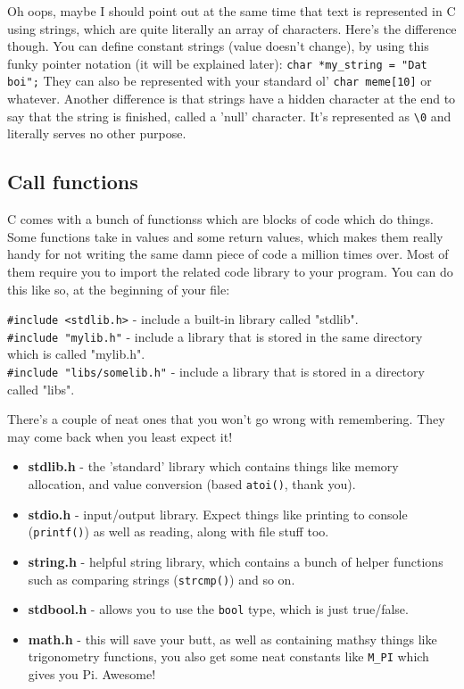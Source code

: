 Oh oops, maybe I should point out at the same time that text is represented in C using \glspl{string}, which are quite literally an array of characters. Here's the difference though. You can define \gls{constant} strings (value doesn't change), by using this funky pointer notation (it will be explained later): \texttt{char *my\_string = "Dat boi";} They can also be represented with your standard ol' \texttt{char meme[10]} or whatever. Another difference is that strings have a hidden character at the end to say that the string is finished, called a 'null' character. It's represented as \texttt{\textbackslash0} and literally serves no other purpose.

\subsection{Call functions}
C comes with a bunch of \glspl{functions} which are blocks of code which do things. Some functions take in values and some return values, which makes them really handy for not writing the same damn piece of code a million times over. Most of them require you to import the related code \gls{library} to your program. You can do this like so, at the beginning of your file:

\begin{centering}
    \texttt{#include <stdlib.h>} - include a built-in library called "stdlib".\\
    \texttt{#include "mylib.h"} - include a library that is stored in the same directory which is called "mylib.h".\\
    \texttt{#include "libs/somelib.h"} - include a library that is stored in a directory called "libs".
\end{centering}

There's a couple of neat ones that you won't go wrong with remembering. They may come back when you least expect it!
\begin{itemize}
    \item \textbf{stdlib.h} - the 'standard' library which contains things like memory allocation, and value conversion (based \texttt{atoi()}, thank you).
    \item \textbf{stdio.h} - input/output library. Expect things like printing to console (\texttt{printf()}) as well as reading, along with file stuff too.
    \item \textbf{string.h} - helpful string library, which contains a bunch of helper functions such as comparing strings (\texttt{strcmp()}) and so on.
    \item \textbf{stdbool.h} - allows you to use the \texttt{bool} type, which is just true/false.
    \item \textbf{math.h} - this will save your butt, as well as containing mathsy things like trigonometry functions, you also get some neat constants like \texttt{M\_PI} which gives you Pi. Awesome!
\end{itemize}

